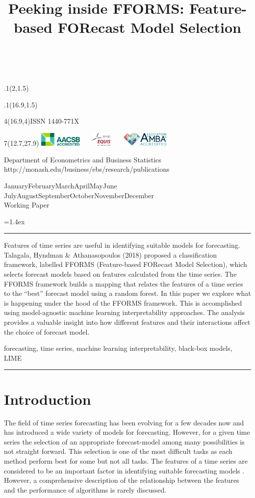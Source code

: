 \documentclass[11pt,a4paper,]{article}
\title{Peeking inside FFORMS: Feature-based FORecast Model Selection}
\date{\sf\Date~\Month~\Year}
\makeatletter
\def\Date{\number\day}
\def\Month{\ifcase\month\or
 January\or February\or March\or April\or May\or June\or
 July\or August\or September\or October\or November\or December\fi}
\def\Year{\number\year}
\def\showjel{{\large\textsf{\textbf{JEL classification:}}~\@jel}}
\def\cover{{\sffamily\setcounter{page}{0}
        \thispagestyle{empty}
        \placefig{2}{1.5}{width=5cm}{monash2}
        \placefig{16.9}{1.5}{width=2.1cm}{MBusSchool}
        \begin{textblock}{4}(16.9,4)ISSN 1440-771X\end{textblock}
        \begin{textblock}{7}(12.7,27.9)\hfill
        \includegraphics[height=0.7cm]{AACSB}~~~
        \includegraphics[height=0.7cm]{EQUIS}~~~
        \includegraphics[height=0.7cm]{AMBA}
        \end{textblock}
        \vspace*{2cm}
        \begin{center}\Large
        Department of Econometrics and Business Statistics\\[.5cm]
        \footnotesize http://monash.edu/business/ebs/research/publications
        \end{center}\vspace{2cm}
        \begin{center}
        \fbox{\parbox{14cm}{\begin{onehalfspace}\centering\Huge\vspace*{0.3cm}
                \textsf{\textbf{\expandafter{\@title}}}\vspace{1cm}\par
                \LARGE\@author\end{onehalfspace}
        }}
        \end{center}
        \vfill
                \begin{center}\Large
                \Month~\Year\\[1cm]
                Working Paper \@wp
        \end{center}\vspace*{2cm}}}
\def\pageone{{\sffamily\setstretch{1}%
        \thispagestyle{empty}%
        \vbox to \textheight{%
        \raggedright\baselineskip=1.2cm
     {\fontsize{24.88}{30}\sffamily\textbf{\expandafter{\@title}}}
        \vspace{2cm}\par
        \hspace{1cm}\parbox{14cm}{\sffamily\large\@addresses}\vspace{1cm}\vfill
        \hspace{1cm}{\large\Date~\Month~\Year}\\[1cm]
        \hspace{1cm}\showjel\vss}}}
\def\blindtitle{{\sffamily
     \thispagestyle{plain}\raggedright\baselineskip=1.2cm
     {\fontsize{24.88}{30}\sffamily\textbf{\expandafter{\@title}}}\vspace{1cm}\par
        }}
\def\titlepage{{\cover\newpage\pageone\newpage\blindtitle}}
\let\maketitle\titlepage
\newenvironment{keywords}{\par\vspace{0.5cm}\noindent{\sffamily\textbf{Keywords:}}}{\vspace{0.25cm}\par\hrule\vspace{0.5cm}\par}
\renewenvironment{abstract}{\begin{minipage}{\textwidth}\parskip=1.4ex\noindent
\hrule\vspace{0.1cm}\par{\sffamily\textbf{\abstractname}}\newline}
  {\end{minipage}}
\def\placefig#1#2#3#4{\begin{textblock}{.1}(#1,#2)\rlap{\texttt{[image: \#4]}}\end{textblock}}
\makeatother
\begin{document}
\maketitle
\begin{abstract}
Features of time series are useful in identifying suitable models for
forecasting. Talagala, Hyndman \& Athanasopoulos (2018) proposed a
classification framework, labelled FFORMS (Feature-based FORecast Model
Selection), which selects forecast models based on features calculated
from the time series. The FFORMS framework builds a mapping that relates
the features of a time series to the ``best'' forecast model using a
random forest. In this paper we explore what is happening under the hood
of the FFORMS framework. This is accomplished using model-agnostic
machine learning interpretability approaches. The analysis provides a
valuable insight into how different features and their interactions
affect the choice of forecast model.
\end{abstract}
\begin{keywords}
forecasting, time series, machine learning interpretability, black-box
models, LIME
\end{keywords}

\section{Introduction}\label{intro}

The field of time series forecasting has been evolving for a few decades
now and has introduced a wide variety of models for forecasting.
However, for a given time series the selection of an appropriate
forecast-model among many possibilities is not straight forward. This
selection is one of the most difficult tasks as each method perform best
for some but not all tasks. The features of a time series are considered
to be an important factor in identifying suitable forecasting models
\autocites{collopy1992rule}{meade2000evidence}{makridakis2000m3}{wang2009rule}.
However, a comprehensive description of the relationship between the
features and the performance of algorithms is rarely discussed.
\end{document}
